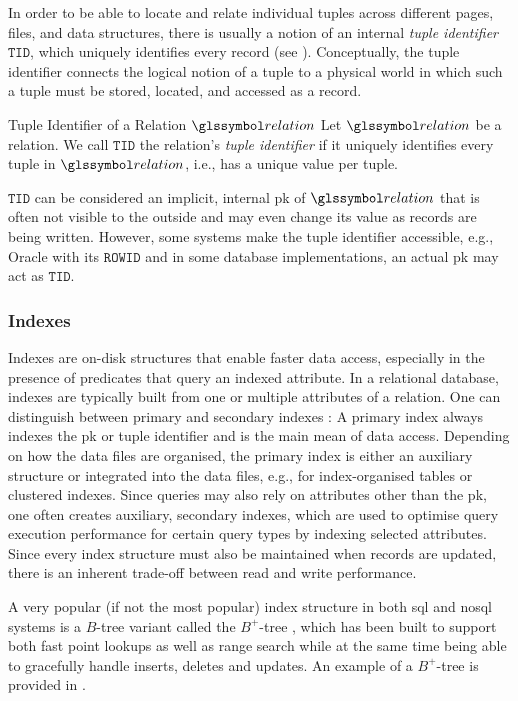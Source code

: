 In order to be able to locate and relate individual tuples across different pages, files, and data structures, there is usually a notion of an internal \emph{tuple identifier} $\mathtt{TID}$, which uniquely identifies every record (see ). Conceptually, the tuple identifier connects the logical notion of a tuple to a physical world in which such a tuple must be stored, located, and accessed as a record.

\begin{definition}[label=definition:tuple_identifier]{Tuple Identifier of a Relation $\relation$}{}
    Let $\relation$ be a relation. We call $\mathtt{TID}$ the relation's \emph{tuple identifier} if it uniquely identifies every tuple in $\relation$, i.e., has a unique value per tuple.
\end{definition}

$\mathtt{TID}$ can be considered an implicit, internal \acrshort{pk} of $\relation$ that is often not visible to the outside and may even change its value as records are being written. However, some systems make the tuple identifier accessible, e.g., Oracle with its $\mathtt{ROWID}$ and in some database implementations, an actual \acrshort{pk} may act as $\mathtt{TID}$.

\subsubsection{Indexes}
\label{section:indexes}
Indexes are on-disk structures that enable faster data access, especially in the presence of predicates that query an indexed attribute. In a relational database, indexes are typically built from one or multiple attributes of a relation. One can distinguish between primary and secondary indexes \cite{Petrov:2019Database}: A primary index always indexes the \acrshort{pk} or tuple identifier and is the main mean of data access. Depending on how the data files are organised, the primary index is either an auxiliary structure or integrated into the data files, e.g., for index-organised tables or clustered indexes. Since queries may also rely on attributes other than the \acrshort{pk}, one often creates auxiliary, secondary indexes, which are used to optimise query execution performance for certain query types by indexing selected attributes. Since every index structure must also be maintained when records are updated, there is an inherent trade-off between read and write performance.

A very popular (if not the most popular) index structure in both \acrshort{sql} and \acrshort{nosql} systems is a $B$-tree \cite{Bayer:2002Organization} variant called the $B^{+}$-tree \cite{Garcia:2009Database}, which has been built to support both fast point lookups as well as range search while at the same time being able to gracefully handle inserts, deletes and updates. An example of a $B^{+}$-tree is provided in .

